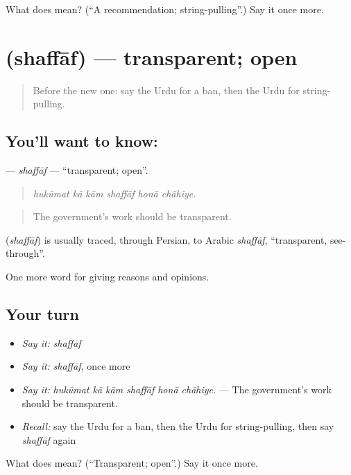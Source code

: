 \begin{tcolorbox}[breakable,colback=teal!4,colframe=teal!35!black,title={Before you move on}]
What does  mean? (\textquotedblleft{}A recommendation; string-pulling\textquotedblright{}.) Say it once more.
\end{tcolorbox}
\section[\texorpdfstring{\ur{شفاف} (shaffāf)}{شفاف (shaffāf)}]{ (shaffāf) — transparent; open}

\label{lesson:UR-C357-shaffaf}



\begin{quote}
Before the new one: say the Urdu for a ban, then the Urdu for string-pulling.
\end{quote}

\subsection*{You'll want to know: }
\textbf{} — \emph{shaffāf} — \textquotedblleft{}transparent; open\textquotedblright{}.

\begin{quote}
     
\end{quote}

\begin{quote}
\emph{hukūmat kā kām shaffāf honā chāhiye.}
\end{quote}

\begin{quote}
The government's work should be transparent.
\end{quote}

\begin{cousinweb}
\textbf{} (\emph{shaffāf}) is usually traced, through Persian, to Arabic \emph{shaffāf}, \textquotedblleft{}transparent, see-through\textquotedblright{}.
\end{cousinweb}

\begin{grammarlens}[title={What you've built}]
One more word for giving reasons and opinions.
\end{grammarlens}

\subsection*{Your turn}
\begin{itemize}
\raggedright
  \item \emph{Say it:} \emph{shaffāf}
  \item \emph{Say it:} \emph{shaffāf}, once more
  \item \emph{Say it:} \emph{hukūmat kā kām shaffāf honā chāhiye.} — The government's work should be transparent.
  \item \emph{Recall:} say the Urdu for a ban, then the Urdu for string-pulling, then say \emph{shaffāf} again
\end{itemize}

\begin{tcolorbox}[breakable,colback=teal!4,colframe=teal!35!black,title={Before you move on}]
What does  mean? (\textquotedblleft{}Transparent; open\textquotedblright{}.) Say it once more.
\end{tcolorbox}
